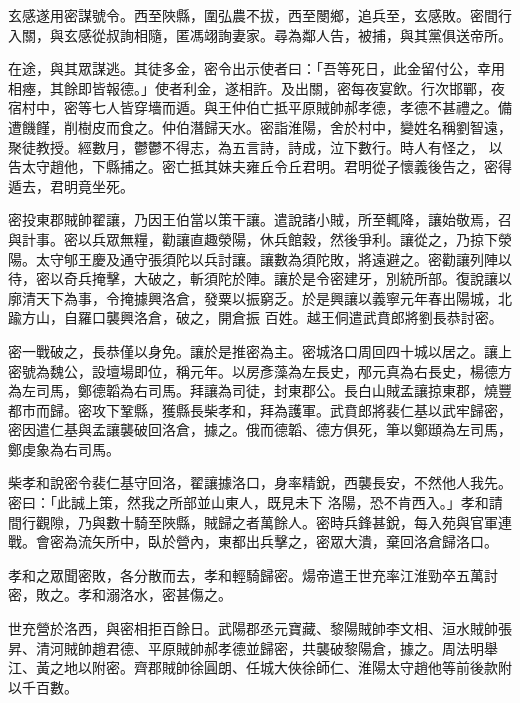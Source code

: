 \begin{pinyinscope}
 玄感遂用密謀號令。西至陜縣，圍弘農不拔，西至閿鄉，追兵至，玄感敗。密間行入關，與玄感從叔詢相隨，匿馮翊詢妻家。尋為鄰人告，被捕，與其黨俱送帝所。



 在途，與其眾謀逃。其徒多金，密令出示使者曰：「吾等死日，此金留付公，幸用相瘞，其餘即皆報德。」使者利金，遂相許。及出關，密每夜宴飲。行次邯鄲，夜宿村中，密等七人皆穿墻而遁。與王仲伯亡抵平原賊帥郝孝德，孝德不甚禮之。備遭饑饉，削樹皮而食之。仲伯潛歸天水。密詣淮陽，舍於村中，變姓名稱劉智遠，聚徒教授。經數月，鬱鬱不得志，為五言詩，詩成，泣下數行。時人有怪之，
 以告太守趙他，下縣捕之。密亡抵其妹夫雍丘令丘君明。君明從子懷義後告之，密得遁去，君明竟坐死。



 密投東郡賊帥翟讓，乃因王伯當以策干讓。遣說諸小賊，所至輒降，讓始敬焉，召與計事。密以兵眾無糧，勸讓直趣滎陽，休兵館穀，然後爭利。讓從之，乃掠下滎陽。太守郇王慶及通守張須陀以兵討讓。讓數為須陀敗，將遠避之。密勸讓列陣以待，密以奇兵掩擊，大破之，斬須陀於陣。讓於是令密建牙，別統所部。復說讓以廓清天下為事，令掩據興洛倉，發粟以振窮乏。於是興讓以義寧元年春出陽城，北踰方山，自羅口襲興洛倉，破之，開倉振
 百姓。越王侗遣武賁郎將劉長恭討密。



 密一戰破之，長恭僅以身免。讓於是推密為主。密城洛口周回四十城以居之。讓上密號為魏公，設壇場即位，稱元年。以房彥藻為左長史，邴元真為右長史，楊德方為左司馬，鄭德韜為右司馬。拜讓為司徒，封東郡公。長白山賊孟讓掠東郡，燒豐都市而歸。密攻下鞏縣，獲縣長柴孝和，拜為護軍。武賁郎將裴仁基以武牢歸密，密因遣仁基與孟讓襲破回洛倉，據之。俄而德韜、德方俱死，筆以鄭頲為左司馬，鄭虔象為右司馬。



 柴孝和說密令裴仁基守回洛，翟讓據洛口，身率精銳，西襲長安，不然他人我先。密曰：「此誠上策，然我之所部並山東人，既見未下
 洛陽，恐不肯西入。」孝和請間行觀隙，乃與數十騎至陜縣，賊歸之者萬餘人。密時兵鋒甚銳，每入苑與官軍連戰。會密為流矢所中，臥於營內，東都出兵擊之，密眾大潰，棄回洛倉歸洛口。



 孝和之眾聞密敗，各分散而去，孝和輕騎歸密。煬帝遣王世充率江淮勁卒五萬討密，敗之。孝和溺洛水，密甚傷之。



 世充營於洛西，與密相拒百餘日。武陽郡丞元寶藏、黎陽賊帥李文相、洹水賊帥張昇、清河賊帥趙君德、平原賊帥郝孝德並歸密，共襲破黎陽倉，據之。周法明舉江、黃之地以附密。齊郡賊帥徐圓朗、任城大俠徐師仁、淮陽太守趙他等前後款附
 以千百數。




\end{pinyinscope}
